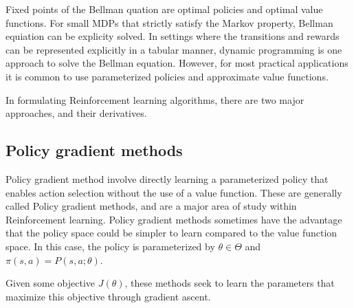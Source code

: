 Fixed points of the Bellman quation are optimal policies and optimal value functions.
For small MDPs that strictly satisfy the Markov property, Bellman equiation can be explicity
solved.
In settings where the transitions and rewards can be represented explicitly in a tabular manner,
dynamic programming is one approach to solve the Bellman equation.
However, for most practical applications it is common to use parameterized policies and approximate
value functions.

In formulating Reinforcement learning algorithms, there are two major approaches, and their
derivatives.

\label{sec:spg} \subsection{Policy gradient methods}\label{sec:pg}

Policy gradient method involve directly learning a parameterized policy that enables action selection 
without the use of a value function.
These are generally called Policy gradient methods, and are a major area of study within Reinforcement learning.
Policy gradient methods sometimes have the advantage that the policy space could be simpler to
learn compared to the value function space.
In this case, the policy is parameterized by $\theta \in \Theta$ and $\pi(s, a) = P(s, a; \theta)$.

Given some objective $J(\theta)$, these methods seek to learn the parameters that maximize this objective through 
gradient ascent.


